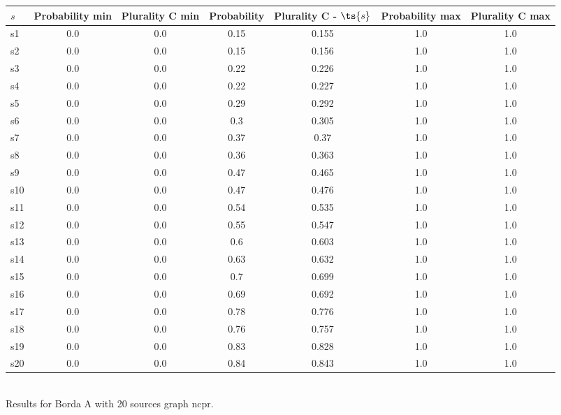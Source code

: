 \documentclass{article}
\begin{document}
\noindent\begin{tabular}{|l|c|c|c|c|c|c|}
\hline
$s$& Probability min & Plurality C min & Probability & Plurality C - $\ts{s}$ & Probability max & Plurality C max\\
\hline
s1 &0.0 & 0.0 & 0.15 & 0.155 & 1.0 & 1.0\\
\hline
s2 &0.0 & 0.0 & 0.15 & 0.156 & 1.0 & 1.0\\
\hline
s3 &0.0 & 0.0 & 0.22 & 0.226 & 1.0 & 1.0\\
\hline
s4 &0.0 & 0.0 & 0.22 & 0.227 & 1.0 & 1.0\\
\hline
s5 &0.0 & 0.0 & 0.29 & 0.292 & 1.0 & 1.0\\
\hline
s6 &0.0 & 0.0 & 0.3 & 0.305 & 1.0 & 1.0\\
\hline
s7 &0.0 & 0.0 & 0.37 & 0.37 & 1.0 & 1.0\\
\hline
s8 &0.0 & 0.0 & 0.36 & 0.363 & 1.0 & 1.0\\
\hline
s9 &0.0 & 0.0 & 0.47 & 0.465 & 1.0 & 1.0\\
\hline
s10 &0.0 & 0.0 & 0.47 & 0.476 & 1.0 & 1.0\\
\hline
s11 &0.0 & 0.0 & 0.54 & 0.535 & 1.0 & 1.0\\
\hline
s12 &0.0 & 0.0 & 0.55 & 0.547 & 1.0 & 1.0\\
\hline
s13 &0.0 & 0.0 & 0.6 & 0.603 & 1.0 & 1.0\\
\hline
s14 &0.0 & 0.0 & 0.63 & 0.632 & 1.0 & 1.0\\
\hline
s15 &0.0 & 0.0 & 0.7 & 0.699 & 1.0 & 1.0\\
\hline
s16 &0.0 & 0.0 & 0.69 & 0.692 & 1.0 & 1.0\\
\hline
s17 &0.0 & 0.0 & 0.78 & 0.776 & 1.0 & 1.0\\
\hline
s18 &0.0 & 0.0 & 0.76 & 0.757 & 1.0 & 1.0\\
\hline
s19 &0.0 & 0.0 & 0.83 & 0.828 & 1.0 & 1.0\\
\hline
s20 &0.0 & 0.0 & 0.84 & 0.843 & 1.0 & 1.0\\
\hline
\end{tabular}\\

\noindent Results for Borda A with 20 sources graph ncpr.
\end{document}
